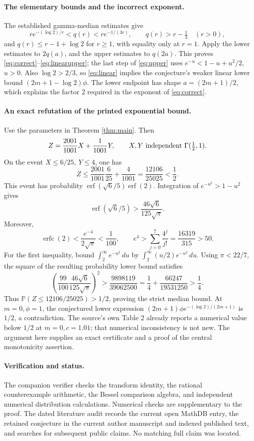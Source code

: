\documentclass[11pt]{article}
\newcommand{\Prob}{\mathbb P}
\begin{document}
\paragraph{The elementary bounds and the incorrect exponent.}
The established gamma-median estimates \cite{BP,GM} give
\[
 r e^{-(\log2)/r}<q(r)<r e^{-1/(3r)},\qquad
 q(r)>r-\tfrac13 \quad(r>0),
\]
and \(q(r)\leq r-1+\log2\) for \(r\geq1\), with equality only at \(r=1\).
Apply the lower estimates to \(2q(a)\), and the upper estimates to
\(q(2a)\). This proves \eqref{eq:correct}--\eqref{eq:linearupper};
the last step of \eqref{eq:upper} uses \(e^{-u}<1-u+u^2/2\), \(u>0\).
Also \(\log2>2/3\), so \eqref{eq:linear} implies the conjecture's
weaker linear lower bound \((2m+1-\log2)\phi\).
The lower endpoint has shape \(a=(2m+1)/2\), which explains the
factor \(2\) required in the exponent of \eqref{eq:correct}.

\paragraph{An exact refutation of the printed exponential bound.}
Use the parameters in Theorem \ref{thm:main}. Then
\[
 Z=\frac{2001}{1001}X+\frac1{1001}Y,\qquad
 X,Y\ \hbox{independent }\Gamma(\tfrac12,1).
\]
On the event \(X\leq6/25,\ Y\leq4\), one has
\[
 Z\leq \frac{2001}{1001}\frac6{25}+\frac4{1001}
      =\frac{12106}{25025}<\frac12 .
\]
This event has probability
\(\operatorname{erf}(\sqrt6/5)\operatorname{erf}(2)\).
Integration of \(e^{-u^2}>1-u^2\) gives
\[
 \operatorname{erf}(\sqrt6/5)>
 \frac{46\sqrt6}{125\sqrt\pi}.
\]
Moreover,
\[
 \operatorname{erfc}(2)
 <\frac{e^{-4}}{2\sqrt\pi}<\frac1{100},
 \qquad
 e^4>\sum_{j=0}^7\frac{4^j}{j!}=\frac{16319}{315}>50 .
\]
For the first inequality, bound
\(\int_2^\infty e^{-u^2}\,du\) by
\(\int_2^\infty(u/2)e^{-u^2}\,du\).
Using \(\pi<22/7\), the square of the resulting probability lower
bound satisfies
\[
 \left(\frac{99}{100}\frac{46\sqrt6}{125\sqrt\pi}\right)^2
 >\frac{9898119}{39062500}
 =\frac14+\frac{66247}{19531250}>\frac14.
\]
Thus \(\Prob(Z\leq12106/25025)>1/2\), proving the strict median bound.
At \(m=0,\phi=1\), the conjectured lower expression
\((2m+1)\phi e^{-(\log2)/(2m+1)}\) is \(1/2\), a contradiction.
The source's own Table 2 already reports a numerical value below
\(1/2\) at \(m=0,c=1.01\); that numerical inconsistency is not new.
The argument here supplies an exact certificate and a proof of the
central monotonicity assertion.

\paragraph{Verification and status.}
The companion verifier checks the transform identity, the rational
counterexample arithmetic, the Bessel comparison algebra, and
independent numerical distribution calculations. Numerical checks
are supplementary to the proof. The dated literature audit records
the current open MathDB entry, the retained conjecture in the current
author manuscript and indexed published text, and searches for
subsequent public claims. No matching full claim was located.
\end{document}

